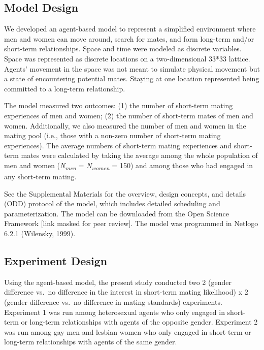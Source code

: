 \documentclass[
  11pt,
]{article}
\begin{document}
\hypertarget{model-design}{%
\subsection{Model Design}\label{model-design}}

We developed an agent-based model to represent a simplified environment
where men and women can move around, search for mates, and form
long-term and/or short-term relationships. Space and time were modeled
as discrete variables. Space was represented as discrete locations on a
two-dimensional 33*33 lattice. Agents' movement in the space was not
meant to simulate physical movement but a state of encountering
potential mates. Staying at one location represented being committed to
a long-term relationship.

The model measured two outcomes: (1) the number of short-term mating
experiences of men and women; (2) the number of short-term mates of men
and women. Additionally, we also measured the number of men and women in
the mating pool (i.e., those with a non-zero number of short-term mating
experiences). The average numbers of short-term mating experiences and
short-term mates were calculated by taking the average among the whole
population of men and women (\emph{N\textsubscript{men}} =
\emph{N\textsubscript{women}} = 150) and among those who had engaged in
any short-term mating.

See the Supplemental Materials for the overview, design concepts, and
details (ODD) protocol of the model, which includes detailed scheduling
and parameterization. The model can be downloaded from the Open Science
Framework {[}link masked for peer review{]}. The model was programmed in
Netlogo 6.2.1 (Wilensky, 1999).

\hypertarget{experiment-design}{%
\subsection{Experiment Design}\label{experiment-design}}

Using the agent-based model, the present study conducted two 2 (gender
difference vs.~no difference in the interest in short-term mating
likelihood) x 2 (gender difference vs.~no difference in mating
standards) experiments. Experiment 1 was run among heterosexual agents
who only engaged in short-term or long-term relationships with agents of
the opposite gender. Experiment 2 was run among gay men and lesbian
women who only engaged in short-term or long-term relationships with
agents of the same gender.
\end{document}
